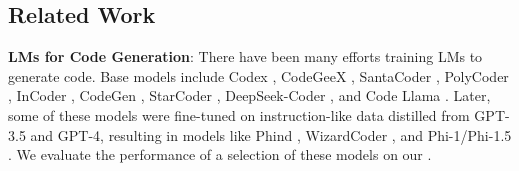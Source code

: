 


\subsection{Related Work} \label{sec:related-work}

\noindent \textbf{LMs for Code Generation}: There have been many efforts training LMs to generate code. Base models include Codex \citep{chen2021evaluating}, CodeGeeX \citep{zheng2023codegeex}, SantaCoder \citep{allal2023santacoder}, PolyCoder \citep{xu2022systematic}, InCoder \citep{fried2022incoder}, CodeGen \citep{nijkamp2022codegen}, StarCoder \citep{li2023starcoder}, DeepSeek-Coder \citep{deepseek-coder}, and Code Llama \citep{roziere2023code}. Later, some of these models were fine-tuned on instruction-like data distilled from GPT-3.5 and GPT-4, resulting in models like Phind \citep{Phind}, WizardCoder \citep{luo2023wizardcoder}, and Phi-1/Phi-1.5 \citep{li2023textbooks, gunasekar2023textbooks}. We evaluate the performance of a selection of these models on our \benchmark.

